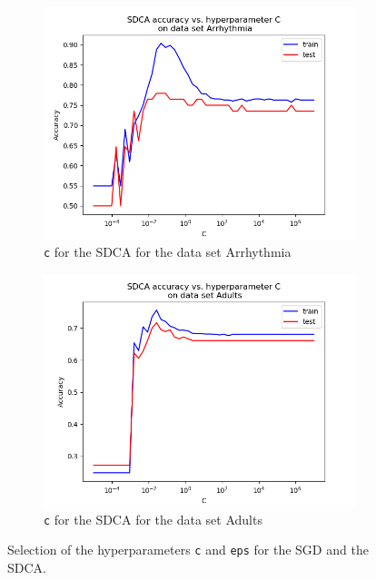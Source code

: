 \documentclass{article}
\begin{document}
\begin{figure}[H]
	\begin{subfigure}[t]{0.45\linewidth}
		\includegraphics[width=\linewidth]{arrhythmia_sdca_c.png}
		\caption{\texttt{c} for the SDCA for the data set Arrhythmia}
	\end{subfigure}
	\begin{subfigure}[t]{0.45\linewidth}
		\includegraphics[width=\linewidth]{adults_sdca_c.png}
		\caption{\texttt{c} for the SDCA for the data set Adults}
	\end{subfigure}
	\caption{Selection of the hyperparameters \texttt{c} and \texttt{eps} for the SGD and the SDCA.}
\end{figure}
\end{document}
